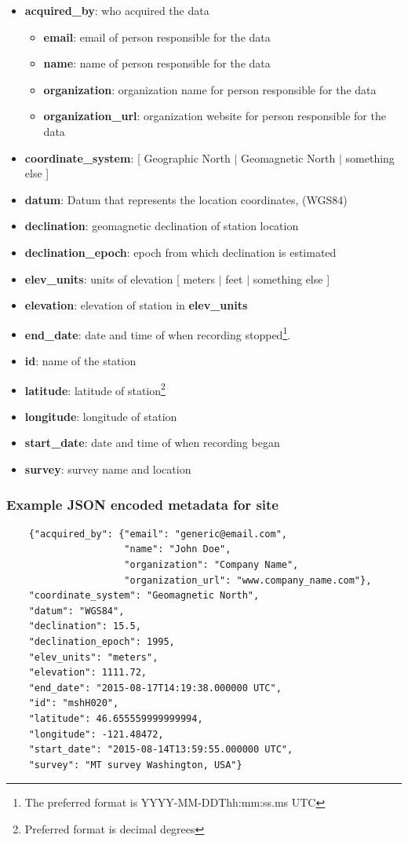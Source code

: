 \documentclass{article}
\newcommand{\attr}[1]{\textbf{#1}}
\begin{document}
\begin{itemize}
	\setlength{\itemsep}{.05em}
	\item \attr{acquired\_by}: who acquired the data
	\begin{itemize}
		\setlength{\itemsep}{.05em}
		\item \attr{email}: email of person responsible for the data
		\item \attr{name}: name of person responsible for the data
		\item \attr{organization}: organization name for person responsible for the data
		\item \attr{organization\_url}: organization website for person responsible for the data
	\end{itemize}
	\item \attr{coordinate\_system}: [ Geographic North $|$ Geomagnetic North $|$ something else ]
	\item \attr{datum}: Datum that represents the location coordinates, (WGS84)
	\item \attr{declination}: geomagnetic declination of station location
	\item \attr{declination\_epoch}: epoch from which declination is estimated
	\item \attr{elev\_units}: units of elevation [ meters $|$ feet $|$ something else ]
	\item \attr{elevation}: elevation of station in \attr{elev\_units}
	\item \attr{end\_date}: date and time of when recording stopped\footnote[1]{The preferred format is YYYY-MM-DDThh:mm:ss.ms UTC}.
	\item \attr{id}: name of the station
	\item \attr{latitude}: latitude of station\footnote[2]{Preferred format is decimal degrees}
	\item \attr{longitude}: longitude of station\footnotemark[2]
	\item \attr{start\_date}: date and time of when recording began\footnotemark[1]
	\item \attr{survey}: survey name and location  
\end{itemize}

\subsubsection{Example JSON encoded metadata for \textbf{site}}
\begin{verbatim}
	{"acquired_by": {"email": "generic@email.com",
	                 "name": "John Doe",
	                 "organization": "Company Name",
	                 "organization_url": "www.company_name.com"},
	"coordinate_system": "Geomagnetic North",
	"datum": "WGS84",
	"declination": 15.5,
	"declination_epoch": 1995,
	"elev_units": "meters",
	"elevation": 1111.72,
	"end_date": "2015-08-17T14:19:38.000000 UTC",
	"id": "mshH020",
	"latitude": 46.655559999999994,
	"longitude": -121.48472,
	"start_date": "2015-08-14T13:59:55.000000 UTC",
	"survey": "MT survey Washington, USA"}
\end{verbatim}
\end{document}
